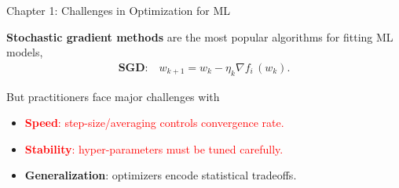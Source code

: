 \documentclass[mathserif,notheorems, hyperref={colorlinks, citecolor=blue, urlcolor=blue, linkcolor=blue}]{beamer}
\def\\{}%
\begin{document}
    \begin{frame}{Chapter 1: Challenges in Optimization for ML}

        \textbf{Stochastic gradient methods} are the most popular algorithms for fitting ML models,
        \begin{align*}
            \textbf{SGD:} \quad w_{k + 1} = w_k - \eta_k \nabla f_i \, (w_k). \\
        \end{align*}


        But practitioners face major challenges with \vspace{0.5em}
        \begin{itemize}
            \item \textcolor{red}{\textbf{Speed}: step-size/averaging controls convergence rate.}
            \item \textcolor{red}{\textbf{Stability}: hyper-parameters must be tuned carefully.}
            \item \textbf{Generalization}: optimizers encode statistical tradeoffs.
        \end{itemize}
        \vspace{1em}

    \end{frame}
\end{document}
